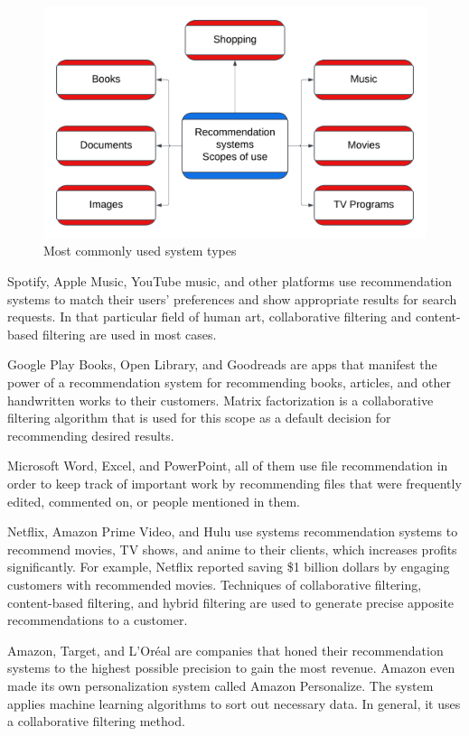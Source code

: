 \documentclass[10pt,twoside,english,a4paper]{article}
\begin{document}
\begin{figure}[h]
\centering
\includegraphics[width=1\textwidth]{system_types}
\caption{Most commonly used system types}
\label{fig:Types}
\end{figure}
\par Spotify, Apple Music, YouTube music, and other platforms use recommendation systems to match their users' preferences and show appropriate results for search requests. In that particular field of human art, collaborative filtering and content-based filtering are used in most cases.\cite{music_rec}
\par Google Play Books, Open Library, and Goodreads are apps that manifest the power of a recommendation system for recommending books, articles, and other handwritten works to their customers. Matrix factorization is a collaborative filtering algorithm that is used for this scope as a default decision for recommending desired results.\cite{book_rec}
\par Microsoft Word, Excel, and PowerPoint, all of them use file recommendation in order to keep track of important work by recommending files that were frequently edited, commented on, or people mentioned in them. \cite{file_rec}
\par Netflix, Amazon Prime Video, and Hulu use systems recommendation systems to recommend movies, TV shows, and anime to their clients, which increases profits significantly. For example, Netflix reported saving \$1 billion dollars by engaging customers with recommended movies. Techniques of collaborative filtering, content-based filtering, and hybrid filtering are used to generate precise apposite recommendations to a customer.\cite{movie_rec}
\par Amazon, Target, and L’Oréal are companies that honed their recommendation systems to the highest possible precision to gain the most revenue. Amazon even made its own personalization system called Amazon Personalize. The system applies machine learning algorithms to sort out necessary data. In general, it uses a collaborative filtering method.\cite{shopping_rec}\cite{amazon_recsys}
\end{document}
